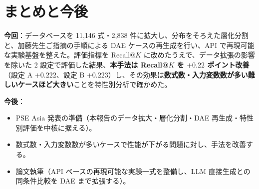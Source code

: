 \documentclass[11pt,a4paper]{ltjsarticle}
\begin{document}
\section{まとめと今後}
\textbf{今回}：データベースを 11{,}146 式・2{,}838 件に拡大し、分布をそろえた層化分割と、加藤先生ご指摘の手順による DAE ケースの再生成を行い、API で再現可能な実験基盤を整えた。評価指標を Recall@$K$ に改めたうえで、データ拡張の影響を除いた 2 設定で評価した結果、\textbf{本手法は Recall@$K$ を $+0.22$ ポイント改善}（設定 A $+0.222$、設定 B $+0.223$）し、その効果は\textbf{数式数・入力変数数が多い難しいケースほど大きい}ことを特性別分析で確かめた。

\textbf{今後}：
\begin{itemize}[leftmargin=1.5em]
  \item PSE Asia 発表の準備（本報告のデータ拡大・層化分割・DAE 再生成・特性別評価を中核に据える）。
  \item 数式数・入力変数数が多いケースで性能が下がる問題に対し、手法を改善する。
  \item 論文執筆（API ベースの再現可能な実験一式を整備し、LLM 直接生成との同条件比較を DAE まで拡張する）。
\end{itemize}
\end{document}
